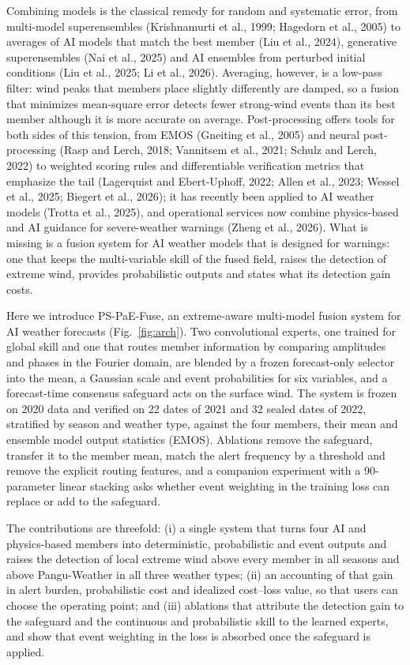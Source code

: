 \documentclass[12pt]{article}
\begin{document}
Combining models is the classical remedy for random and systematic error, from multi-model superensembles (Krishnamurti et al., 1999; Hagedorn et al., 2005) to averages of AI models that match the best member (Liu et al., 2024), generative superensembles (Nai et al., 2025) and AI ensembles from perturbed initial conditions (Liu et al., 2025; Li et al., 2026). Averaging, however, is a low-pass filter: wind peaks that members place slightly differently are damped, so a fusion that minimizes mean-square error detects fewer strong-wind events than its best member although it is more accurate on average. Post-processing offers tools for both sides of this tension, from EMOS (Gneiting et al., 2005) and neural post-processing (Rasp and Lerch, 2018; Vannitsem et al., 2021; Schulz and Lerch, 2022) to weighted scoring rules and differentiable verification metrics that emphasize the tail (Lagerquist and Ebert-Uphoff, 2022; Allen et al., 2023; Wessel et al., 2025; Biegert et al., 2026); it has recently been applied to AI weather models (Trotta et al., 2025), and operational services now combine physics-based and AI guidance for severe-weather warnings (Zheng et al., 2026). What is missing is a fusion system for AI weather models that is designed for warnings: one that keeps the multi-variable skill of the fused field, raises the detection of extreme wind, provides probabilistic outputs and states what its detection gain costs.

Here we introduce PS-PaE-Fuse, an extreme-aware multi-model fusion system for AI weather forecasts (Fig.~\ref{fig:arch}). Two convolutional experts, one trained for global skill and one that routes member information by comparing amplitudes and phases in the Fourier domain, are blended by a frozen forecast-only selector into the mean, a Gaussian scale and event probabilities for six variables, and a forecast-time consensus safeguard acts on the surface wind. The system is frozen on 2020 data and verified on 22 dates of 2021 and 32 sealed dates of 2022, stratified by season and weather type, against the four members, their mean and ensemble model output statistics (EMOS). Ablations remove the safeguard, transfer it to the member mean, match the alert frequency by a threshold and remove the explicit routing features, and a companion experiment with a 90-parameter linear stacking asks whether event weighting in the training loss can replace or add to the safeguard.

The contributions are threefold: (i) a single system that turns four AI and physics-based members into deterministic, probabilistic and event outputs and raises the detection of local extreme wind above every member in all seasons and above Pangu-Weather in all three weather types; (ii) an accounting of that gain in alert burden, probabilistic cost and idealized cost--loss value, so that users can choose the operating point; and (iii) ablations that attribute the detection gain to the safeguard and the continuous and probabilistic skill to the learned experts, and show that event weighting in the loss is absorbed once the safeguard is applied.
\end{document}
